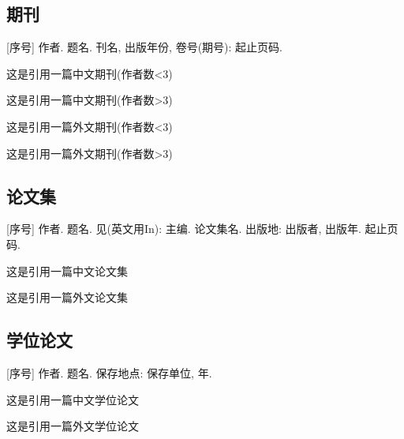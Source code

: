 \documentclass[UTF8, a4paper, 12pt, AutoFakeBold, twoside]{ctexart} %
\begin{document}
\subsection{期刊}

[序号] 作者. 题名\nobreak[J]. 刊名, 出版年份, 卷号(期号): 起止页码.

这是引用一篇中文期刊\cite{李静2021多语言}(作者数<3)

这是引用一篇中文期刊\cite{张德海2018基于}(作者数>3)

这是引用一篇外文期刊\cite{Deng2013ApplicationOE}(作者数<3)

这是引用一篇外文期刊\cite{you2022knowledge}(作者数>3)

\subsection{论文集}

[序号] 作者. 题名\nobreak[A]. 见(英文用In): 主编. 论文集名\nobreak[C]. 出版地: 出版者, 出版年. 起止页码.

这是引用一篇中文论文集\cite{封晨}

这是引用一篇外文论文集\cite{dong2014knowledge}

\subsection{学位论文}

[序号] 作者. 题名\nobreak[D]. 保存地点: 保存单位, 年.

这是引用一篇中文学位论文\cite{姚歆蕾2021基于}

这是引用一篇外文学位论文\cite{w2021e}




\end{document}
